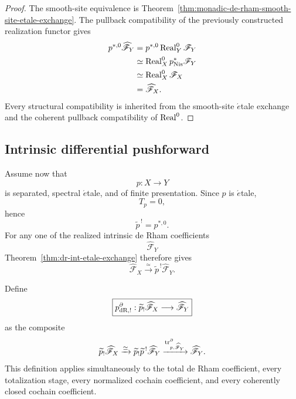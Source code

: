 \begin{proof}
The smooth-site equivalence is
Theorem~\ref{thm:monadic-de-rham-smooth-site-etale-exchange}.  The
pullback compatibility of the previously constructed realization functor gives
\[
\begin{aligned}
    p^{*,0}\widehat{\mathscr F}_Y
    &=
    p^{*,0}\operatorname{Real}^{0}_Y\mathscr F_Y
    \\
    &\simeq
    \operatorname{Real}^{0}_Xp^*_{\mathrm{Nis}}\mathscr F_Y
    \\
    &\simeq
    \operatorname{Real}^{0}_X\mathscr F_X
    \\
    &=
    \widehat{\mathscr F}_X.
\end{aligned}
\]
Every structural compatibility is inherited from the smooth-site
\(\acute{e}\)tale exchange and the coherent pullback compatibility of
\(\operatorname{Real}^{0}\).
\end{proof}

\subsection{Intrinsic differential pushforward}

Assume now that
\[
    p:X\longrightarrow Y
\]
is separated, spectral \(\acute{e}\)tale, and of finite presentation.  Since
\(p\) is \(\acute{e}\)tale,
\[
    T_p=0,
\]
hence
\[
    \widetilde p^{\,!}
    =
    p^{*,0}.
\]
For any one of the realized intrinsic de Rham coefficients
\[
    \widehat{\mathscr F}_Y
\]
Theorem~\ref{thm:dr-int-etale-exchange} therefore gives
\[
\boxed{
    \widehat{\mathscr F}_X
    \xrightarrow{\simeq}
    \widetilde p^{\,!}\widehat{\mathscr F}_Y.
}
\]

\begin{definition}
\label{def:dr-int-etale-push}
\label{def:dr-int-finite-etale-push}
Define
\[
\boxed{
    p_{\mathrm{dR},!}^{\partial}:
    \widetilde p_!
    \widehat{\mathscr F}_X
    \longrightarrow
    \widehat{\mathscr F}_Y
}
\]
as the composite
\[
    \widetilde p_!\widehat{\mathscr F}_X
    \xrightarrow{\simeq}
    \widetilde p_!\widetilde p^{\,!}\widehat{\mathscr F}_Y
    \xrightarrow{\operatorname{tr}^{\partial}_{p,\widehat{\mathscr F}_Y}}
    \widehat{\mathscr F}_Y.
\]
This definition applies simultaneously to the total de Rham coefficient,
every totalization stage, every normalized cochain coefficient, and every
coherently closed cochain coefficient.
\end{definition}

